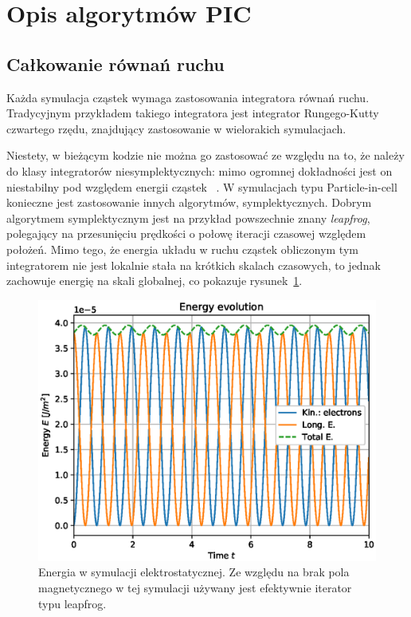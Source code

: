 \section[Opis algorytmów PIC]{Opis algorytmów PIC}\label{sec:implementation}%
\subsection{Całkowanie równań ruchu}
Każda symulacja cząstek wymaga zastosowania integratora równań ruchu.
Tradycyjnym przykładem takiego integratora jest integrator Rungego-Kutty
czwartego rzędu, znajdujący zastosowanie w wielorakich symulacjach.

Niestety, w bieżącym kodzie nie można go zastosować ze względu na to,
że należy do klasy integratorów niesymplektycznych: mimo ogromnej dokładności jest on niestabilny pod
względem energii cząstek~ \cite{computational-physics}. W symulacjach typu
Particle-in-cell konieczne jest zastosowanie innych algorytmów, symplektycznych. Dobrym
algorytmem symplektycznym jest na przykład powszechnie znany
\emph{leapfrog}, polegający na przesunięciu prędkości o połowę iteracji
czasowej względem położeń.\cite{computational-physics} Mimo tego, że energia
układu w ruchu cząstek obliczonym tym integratorem nie jest lokalnie stała na
krótkich skalach czasowych, to jednak zachowuje energię na skali globalnej, co
pokazuje rysunek~\ref{fig:ESE-energy}.

\begin{figure}[h!]
  \includegraphics{Images/ESE_energy_plot}
  \caption{Energia w symulacji elektrostatycznej. Ze względu na brak pola magnetycznego
  w tej symulacji używany jest efektywnie iterator typu leapfrog.\label{fig:ESE-energy}}
\end{figure}

